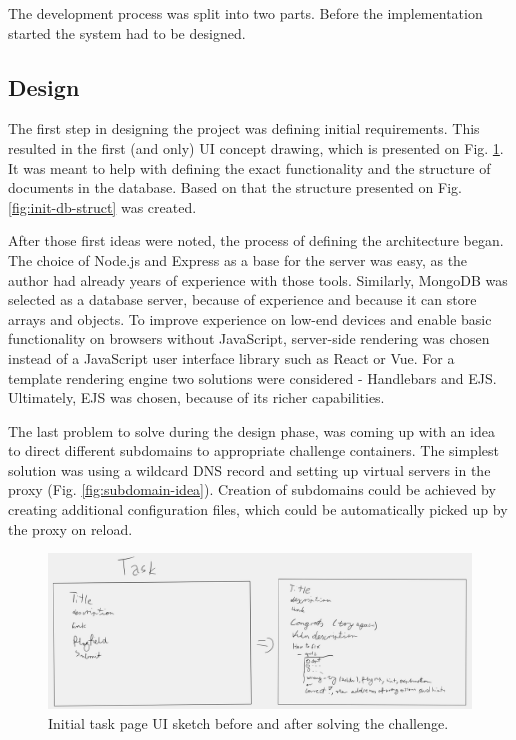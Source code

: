 The development process was split into two parts. Before the implementation started the system had to be designed.

\subsection{Design}

The first step in designing the project was defining initial requirements.
This resulted in the first (and only) UI concept drawing, which is presented on Fig. \ref{fig:init-ui-sketch}. It was meant to help with defining the exact functionality and the structure of documents in the database. Based on that the structure presented on Fig. \ref{fig:init-db-struct} was created.

After those first ideas were noted, the process of defining the architecture began. The choice of Node.js and Express as a base for the server was easy, as the author had already years of experience with those tools. Similarly, MongoDB was selected as a database server, because of experience and because it can store arrays and objects. To improve experience on low-end devices and enable basic functionality on browsers without JavaScript, server-side rendering was chosen instead of a JavaScript user interface library such as React or Vue. For a template rendering engine two solutions were considered - Handlebars and EJS. Ultimately, EJS was chosen, because of its richer capabilities.

The last problem to solve during the design phase, was coming up with an idea to direct different subdomains to appropriate challenge containers. The simplest solution was using a wildcard DNS record and setting up virtual servers in the proxy (Fig. \ref{fig:subdomain-idea}). Creation of subdomains could be achieved by creating additional configuration files, which could be automatically picked up by the proxy on reload.

\begin{figure}
	\centering
	\includegraphics[width=\textwidth]{img/init-ui-sketch.png}
	\caption{Initial task page UI sketch before and after solving the challenge.}
	\label{fig:init-ui-sketch}
\end{figure}


